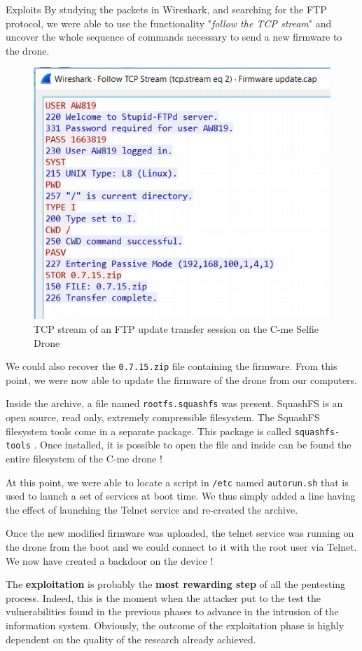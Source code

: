 \begin{chaptercover}{Exploits}
By studying the packets in Wireshark, and searching for the FTP protocol, we were able to use the functionality "\textit{follow the TCP stream}" and uncover the whole sequence of commands necessary to send a new firmware to the drone.

\begin{figure}[H]
  \centering
  \includegraphics[width=.6\linewidth]{figures/ftp-tcp-stream}
  \caption{TCP stream of an FTP update transfer session on the C-me Selfie Drone}
  \label{fig:ftp-tcp-stream}
\end{figure}

We could also recover the \texttt{0.7.15.zip} file containing the firmware. From this point, we were now able to update the firmware of the drone from our computers.

Inside the archive, a file named \texttt{rootfs.squashfs} was present. SquashFS \cite{squashfs} is an open source, read only, extremely compressible filesystem. The SquashFS filesystem tools come in a separate package. This package is called \texttt{squashfs-tools} \cite{squashfs-tools}. Once installed, it is possible to open the file and inside can be found the entire filesystem of the C-me drone !

At this point, we were able to locate a script in \texttt{/etc} named \texttt{autorun.sh} that is used to launch a set of services at boot time. We thus simply added a line having the effect of launching the Telnet service and re-created the archive.

Once the new modified firmware was uploaded, the telnet service was running on the drone from the boot and we could connect to it with the root user via Telnet. We now have created a backdoor on the device !

\begin{summary}
The \textbf{exploitation} is probably the \textbf{most rewarding step} of all the pentesting process. Indeed, this is the moment when the attacker put to the test the vulnerabilities found in the previous phases to advance in the intrusion of the information system. Obviously, the outcome of the exploitation phase is highly dependent on the quality of the research already achieved.


\end{summary}
\end{chaptercover}
